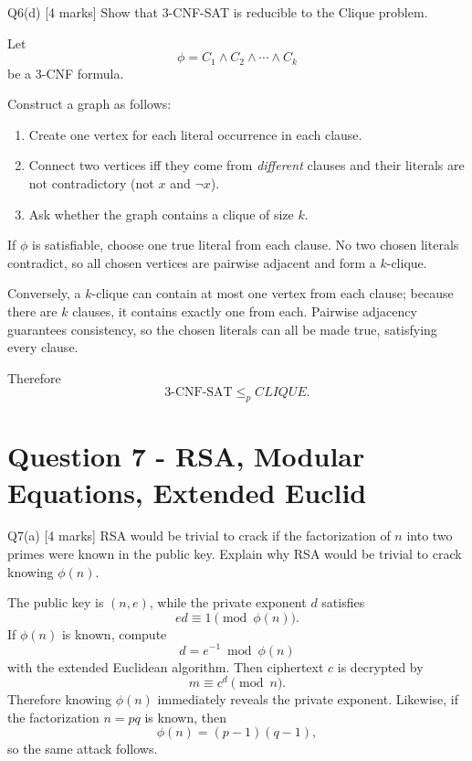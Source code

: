 \documentclass[10.5pt,a4paper]{article}
\begin{document}
\begin{questionbox}{Q6(d) [4 marks]}
Show that 3-CNF-SAT is reducible to the Clique problem.
\end{questionbox}

\begin{answerbox}
Let
\[
\phi=C_1\land C_2\land\cdots\land C_k
\]
be a 3-CNF formula.

Construct a graph as follows:
\begin{enumerate}[leftmargin=6mm]
\item Create one vertex for each literal occurrence in each clause.
\item Connect two vertices iff they come from \emph{different} clauses and their literals are not contradictory (not \(x\) and \(\neg x\)).
\item Ask whether the graph contains a clique of size \(k\).
\end{enumerate}

If \(\phi\) is satisfiable, choose one true literal from each clause. No two chosen literals contradict, so all chosen vertices are pairwise adjacent and form a \(k\)-clique.

Conversely, a \(k\)-clique can contain at most one vertex from each clause; because there are \(k\) clauses, it contains exactly one from each. Pairwise adjacency guarantees consistency, so the chosen literals can all be made true, satisfying every clause.

Therefore
\[
\boxed{3\text{-CNF-SAT}\le_p CLIQUE}.
\]
\end{answerbox}

\section{Question 7 - RSA, Modular Equations, Extended Euclid}

\begin{questionbox}{Q7(a) [4 marks]}
RSA would be trivial to crack if the factorization of \(n\) into two primes were known in the public key. Explain why RSA would be trivial to crack knowing \(\phi(n)\).
\end{questionbox}

\begin{answerbox}
The public key is \((n,e)\), while the private exponent \(d\) satisfies
\[
ed\equiv1\pmod{\phi(n)}.
\]
If \(\phi(n)\) is known, compute
\[
\boxed{d=e^{-1}\bmod\phi(n)}
\]
with the extended Euclidean algorithm. Then ciphertext \(c\) is decrypted by
\[
\boxed{m\equiv c^d\pmod n}.
\]
Therefore knowing \(\phi(n)\) immediately reveals the private exponent. Likewise, if the factorization \(n=pq\) is known, then
\[
\phi(n)=(p-1)(q-1),
\]
so the same attack follows.
\end{answerbox}
\end{document}
